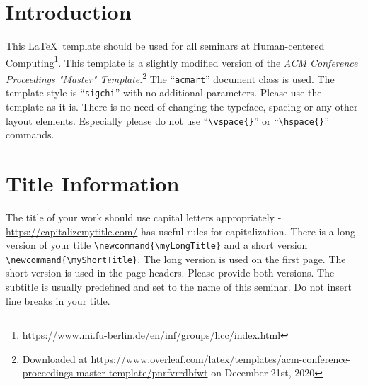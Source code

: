 \documentclass[sigchi]{acmart}
\makeatletter
\newcommand{\myLongTitle}{My Long Title of my Essay} %
\newcommand{\myShortTitle}{Short Title of Essay} %
\makeatother
\begin{document}
\maketitle


\let\oldaddcontentsline\addcontentsline
\newcommand{\stoptocentries}{\renewcommand{\addcontentsline}[3]{}}
\newcommand{\starttocentries}{\let\addcontentsline\oldaddcontentsline}

\stoptocentries%
\tableofcontents
\starttocentries%

\section{Introduction}
This \LaTeX\ template should be used for all seminars at Human-centered Computing\footnote{\url{https://www.mi.fu-berlin.de/en/inf/groups/hcc/index.html}}. This template is a slightly modified version of the \emph{ACM Conference Proceedings "Master" Template}.\footnote{Downloaded at \url{https://www.overleaf.com/latex/templates/acm-conference-proceedings-master-template/pnrfvrrdbfwt} on December 21st, 2020} The ``\verb|acmart|'' document class is used. The template style is ``\verb|sigchi|'' with no additional parameters. Please use the template as it is. There is no need of changing the typeface, spacing or any other layout elements. Especially please do not use ``\verb|\vspace{}|'' or ``\verb|\hspace{}|'' commands.


\section{Title Information}
The title of your work should use capital letters appropriately -
\url{https://capitalizemytitle.com/} has useful rules for
capitalization. There is a long version of your title {\verb|\newcommand{\myLongTitle}|} and a short version {\verb|\newcommand{\myShortTitle}|}. The long version is used on the first page. The short version is used in the page headers. Please provide both versions. The subtitle is usually predefined and set to the name of this seminar. Do not insert line breaks in your title.
\end{document}
